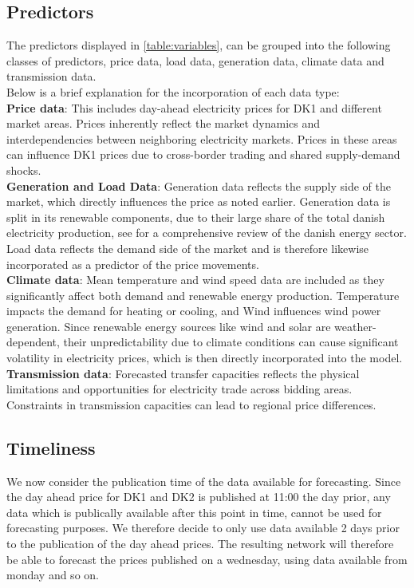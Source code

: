 \documentclass[10pt,a4paper]{article}
\numberwithin{equation}{section} %
\begin{document}
\subsection{Predictors}
The predictors displayed in \ref{table:variables}, can be grouped into the following classes of predictors, price data, load data, generation data, climate data and transmission data.\\
Below is a brief explanation for the incorporation of each data type:\\
\textbf{Price data}: This includes day-ahead electricity prices for DK1 and different market areas. 
Prices inherently reflect the market dynamics and interdependencies between neighboring electricity markets.
Prices in these areas can influence DK1 prices due to cross-border trading and shared supply-demand shocks.\\
\textbf{Generation and Load Data}:
Generation data reflects the supply side of the market, which directly influences the price as noted earlier.
Generation data is split in its renewable components, due to their large share of the total danish electricity production, see \cite{IEADenmark2023} for a comprehensive review of the danish energy sector.
Load data reflects the demand side of the market and is therefore likewise incorporated as a predictor of the price movements.\\
\textbf{Climate data}:
Mean temperature and wind speed data 
are included as they significantly affect both demand and renewable energy production.
Temperature impacts the demand for heating or cooling, and Wind
influences wind power generation.
 Since renewable energy sources like wind and solar are weather-dependent, their unpredictability 
 due to climate conditions can cause significant volatility in electricity prices,
 which is then directly incorporated into the model.\\
\textbf{Transmission data}: Forecasted transfer capacities
reflects the physical limitations and opportunities for electricity trade across bidding areas.
Constraints in transmission capacities can lead to regional price differences.
\subsection{Timeliness}
We now consider the publication time of the data available for forecasting.
Since the day ahead price for DK1 and DK2 is published at 11:00 the day prior, any data which is publically available after this point in time, cannot be used
for forecasting purposes. We therefore decide to only use data available 2 days prior to the publication of the day ahead prices.
The resulting network will therefore be able to forecast the prices published on a wednesday, using data available from monday and so on.
\end{document}
